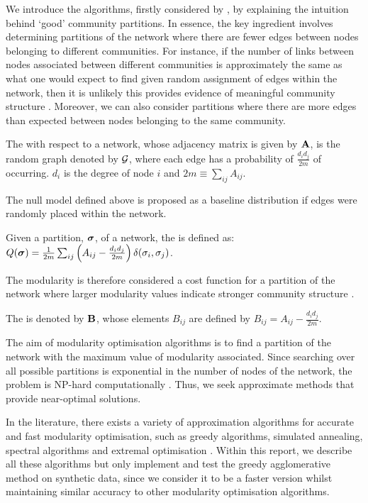 We introduce the algorithms, firstly considered by \cite{New06a,New06b}, by explaining the intuition behind `good' community partitions.
In essence, the key ingredient involves determining partitions of the network where there are fewer edges  between nodes belonging to different communities.
For instance, if the number of links between nodes associated between different communities is approximately the same as what one would expect to find given random assignment of edges within the network, then it is unlikely this provides evidence of meaningful community structure \cite{New06b}.
Moreover, we can also consider partitions where there are more edges than expected between nodes belonging to the same community.
\begin{definition}
	\label{def:nullModel}
	The  with respect to a network, whose adjacency matrix is given by  $\mathbf A$, is the random graph denoted by $\mathcal G$, where each edge has a probability of $\frac{d_{i}d_{j}}{2m}$ of occurring. $d_{i}$ is the degree of node $i$ and $2m \equiv \sum_{ij} A_{ij}$.
\end{definition}
The null model defined above is proposed as a baseline distribution if edges were randomly placed within the network.
\begin{definition}
	\label{def:modularity}
	Given a partition, $\vecvar{\sigma}$, of a network, the  is defined as: $Q(\vecvar{\sigma}) = \frac{1}{2m} \sum_{ij} \left(A_{ij} - \frac{d_{i}d_{j}}{2m} \right) \delta(\sigma_{i},\sigma_{j})$.
\end{definition}
The modularity is therefore considered a cost function for a partition of the network where larger modularity values indicate stronger community structure \cite{New06a}.
\begin{definition}
	\label{def:modularityMatrix}
	The  is denoted by $\mathbf B$, whose elements $B_{ij}$ are defined by $B_{ij} = A_{ij} - \frac{d_{i}d_{j}}{2m}$.
\end{definition}
The aim of modularity optimisation algorithms is to find a partition of the network with the maximum value of modularity associated.
Since searching over all possible partitions is exponential in the number of nodes of the network, the problem is NP-hard computationally \cite{New06b}.
Thus, we seek approximate methods that provide near-optimal solutions.

In the literature, there exists a variety of approximation algorithms for accurate and fast modularity optimisation, such as greedy algorithms, simulated annealing, spectral algorithms and extremal optimisation \cite{For10}.
Within this report, we describe all these algorithms but only implement and test the greedy agglomerative method on synthetic data, since we consider it to be a faster version whilst maintaining similar accuracy to other modularity optimisation algorithms.

